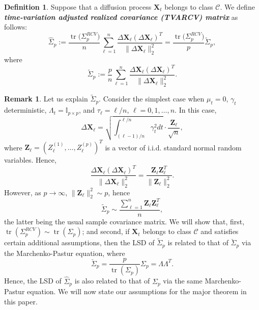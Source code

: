 \documentclass[a4paper,11pt]{article}
\theoremstyle{plain}
\theoremstyle{definition}
\newtheorem{defn}[thm]{Definition}
\newtheorem{rmrk}[thm]{Remark}
\newcommand{\tr}{\operatorname{tr}}
\newcommand{\define}[1]{\textit{\textbf{#1}}}
\begin{document}
    \begin{defn}
   		Suppose that a diffusion process $\mathbf{X}_t$ belongs to class $\mathcal{C}$. We define \define{time-variation adjusted realized covariance (TVARCV) matrix} as follows:
   		\begin{equation} \label{TVARCV}
   		\widehat{\Sigma}_p := \frac{\tr \big( \Sigma_p^{RCV} \big) }{n} \sum_{\ell = 1}^{n} \frac{\Delta \mathbf{X}_\ell (\Delta \mathbf{X}_\ell)^T}{\| \Delta \mathbf{X}_\ell \|_2^2} = \frac{\tr \big( \Sigma_p^{RCV} \big) }{p} \widetilde{\Sigma}_p,
   		\end{equation}
   		where
   		\begin{equation} \label{Sigma_tilde}
   		\widetilde{\Sigma}_p := \frac{p}{n} \sum_{\ell = 1}^{n} \frac{\Delta \mathbf{X}_\ell (\Delta \mathbf{X}_\ell)^T}{\| \Delta \mathbf{X}_\ell \|_2^2}.
   		\end{equation}
    \end{defn}
    
    \begin{rmrk}
    	Let us explain $\widetilde{\Sigma}_p$. Consider the simplest case when $\mu_t = 0$, $\gamma_t$ deterministic, $\Lambda_t = \mathbb{I}_{p \times p}$, and $\tau_{\ell} = \ell / n$, $\ell = 0, 1, \dots, n$. In this case,
    	\[ \Delta \mathbf{X}_\ell = \sqrt{\int_{(\ell - 1)/n}^{\ell / n} \gamma_t^2 dt }\cdot \frac{\mathbf{Z}_\ell}{\sqrt{n}}, \]
    	where $\mathbf{Z}_\ell = (Z_\ell^{(1)}, \dots, Z_\ell^{(p)})^T$ is a vector of i.i.d. standard normal random variables. Hence,
    	\[ \frac{\Delta \mathbf{X}_\ell (\Delta \mathbf{X}_\ell)^T}{\| \Delta \mathbf{X}_\ell \|_2^2} = \frac{\mathbf{Z}_\ell \mathbf{Z}_\ell^T}{\|  \mathbf{Z}_\ell \|_2^2}. \]
    	However, as $p \rightarrow \infty$, $\| \mathbf{Z}_\ell \|_2^2 \sim p$, hence
    	\[ \widetilde{\Sigma}_p \sim \frac{\sum_{\ell = 1}^{n}\mathbf{Z}_\ell \mathbf{Z}_\ell^T}{n}, \]
    	the latter being the usual sample covariance matrix.
    	We will show that, first, $\tr(\Sigma_p^{RCV}) \sim \tr(\Sigma_p)$; and second, if $\mathbf{X}_t$ belongs to class $\mathcal{C}$ and satisfies certain additional assumptions, then the LSD of $\widetilde{\Sigma}_p$ is related to that of $\breve{\Sigma}_p$ via the Marchenko-Pastur equation, where
    	\[ \breve{\Sigma}_p = \frac{p}{\tr(\Sigma_p)}\Sigma_p = \Lambda \Lambda^T. \]
    	Hence, the LSD of $\widehat{\Sigma}_p$ is also related to that of $\Sigma_p$ via the same Marchenko-Pastur equation.
    	We will now state our assumptions for the major theorem in this paper.
    \end{rmrk}
    
\end{document}
